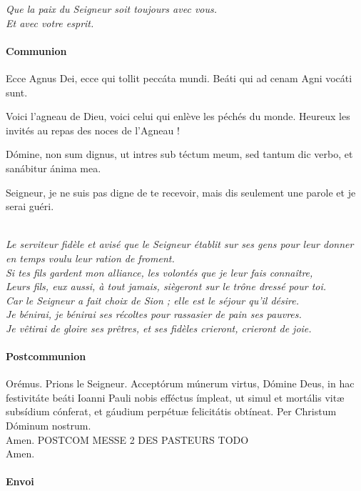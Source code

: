 \documentclass[twoside]{article}
\begin{document}
\emph{\vv Que la paix du Seigneur soit toujours avec vous.\\
\rr Et avec votre esprit.}


\pagebreak

\paragraph{Communion}
\begin{paracol}{2}

Ecce Agnus Dei, ecce qui tollit peccáta mundi.
Beáti qui ad cenam Agni vocáti sunt. 

\switchcolumn

Voici l’agneau de Dieu,
voici celui qui enlève les péchés du monde.
Heureux les invités au repas des noces de l’Agneau !

\switchcolumn*

Dómine, non sum dignus, ut intres sub téctum meum,
sed tantum dic verbo, et sanábitur ánima mea.

\switchcolumn

Seigneur, je ne suis pas digne de te recevoir, mais dis seulement une parole et je serai guéri.

\end{paracol}

 
\\
\emph{\rr Le serviteur fidèle et avisé que le Seigneur établit sur ses gens pour leur donner en temps voulu leur ration de froment.\\
\vv {} Si tes fils gardent mon alliance, les volontés que je leur fais connaître,\\
\vv {} Leurs fils, eux aussi, à tout jamais, siègeront sur le trône dressé pour toi.\\
\vv {} Car le Seigneur a fait choix de Sion ; elle est le séjour qu'il désire.\\
\vv {} Je bénirai, je bénirai ses récoltes pour rassasier de pain ses pauvres.\\
\vv {} Je vêtirai de gloire ses prêtres, et ses fidèles crieront, crieront de joie.
}

\newpage
\paragraph{Postcommunion}
\begin{paracol}{2}
\vv Orémus.
\switchcolumn
\vv Prions le Seigneur.
\switchcolumn*
Acceptórum múnerum virtus, Dómine Deus,
in hac festivitáte beáti Ioanni Pauli nobis efféctus ímpleat,
ut simul et mortális vitæ subsídium cónferat,
et gáudium perpétuæ felicitátis obtíneat.
Per Christum Dóminum nostrum.\\
\rr Amen.
\switchcolumn
POSTCOM MESSE 2 DES PASTEURS TODO\\
\rr Amen.
\end{paracol}

\paragraph{Envoi}


\begin{paracol}{2}
\end{paracol}
\end{document}
